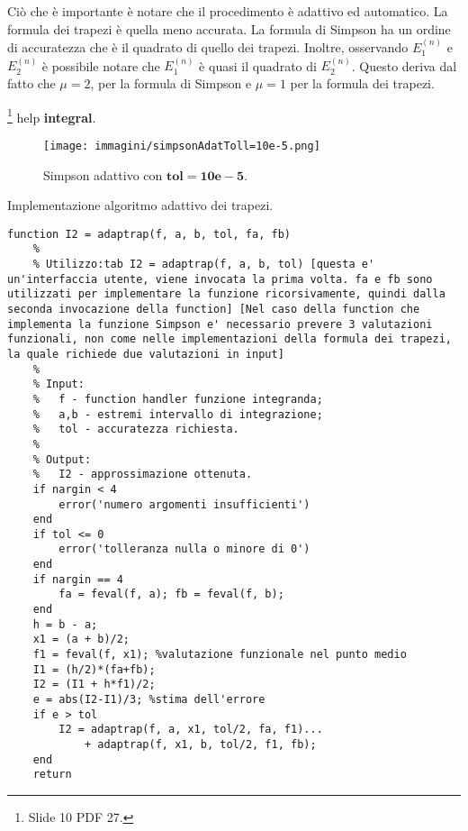 Ciò che è importante è notare che il procedimento è adattivo ed automatico. La formula dei trapezi è quella meno accurata. La formula di Simpson ha un ordine di accuratezza che è il quadrato di quello dei trapezi.
Inoltre, osservando $E_1^{(n)}$ e $E_2^{(n)}$ è possibile notare che $E_1^{(n)}$ è quasi il quadrato di $E_2^{(n)}$. Questo deriva dal fatto che $\mu=2$, per la formula di Simpson e $\mu=1$ per la formula dei trapezi.

\begin{remark}
    \footnote{Slide 10 PDF 27.} help \textbf{integral}.
\end{remark}

\begin{figure}
    \centering
    \texttt{[image: immagini/simpsonAdatToll=10e-5.png]}
    \caption{Simpson adattivo con $\boldsymbol{tol=10e-5}$.}\label{fig:simpsonAdatToll=10e-5}
\end{figure}

\begin{algorithm}\caption{Implementazione algoritmo adattivo dei trapezi.}
\label{alg:algAdattFormTrap}
    \begin{lstlisting}[style=Matlab-editor]
    function I2 = adaptrap(f, a, b, tol, fa, fb)
    %
    % Utilizzo:tab I2 = adaptrap(f, a, b, tol) [questa e' un'interfaccia utente, viene invocata la prima volta. fa e fb sono utilizzati per implementare la funzione ricorsivamente, quindi dalla seconda invocazione della function] [Nel caso della function che implementa la funzione Simpson e' necessario prevere 3 valutazioni funzionali, non come nelle implementazioni della formula dei trapezi, la quale richiede due valutazioni in input]
    %
    % Input:
    %   f - function handler funzione integranda;
    %   a,b - estremi intervallo di integrazione;
    %   tol - accuratezza richiesta.
    %
    % Output:
    %   I2 - approssimazione ottenuta.
    if nargin < 4 
        error('numero argomenti insufficienti')
    end
    if tol <= 0 
        error('tolleranza nulla o minore di 0')
    end 
    if nargin == 4
        fa = feval(f, a); fb = feval(f, b);
    end
    h = b - a;
    x1 = (a + b)/2;
    f1 = feval(f, x1); %valutazione funzionale nel punto medio
    I1 = (h/2)*(fa+fb); 
    I2 = (I1 + h*f1)/2; 
    e = abs(I2-I1)/3; %stima dell'errore
    if e > tol
        I2 = adaptrap(f, a, x1, tol/2, fa, f1)...
            + adaptrap(f, x1, b, tol/2, f1, fb); 
    end
    return
    \end{lstlisting}
\end{algorithm}
